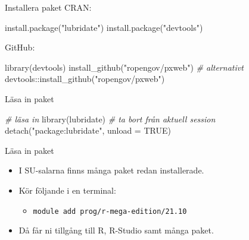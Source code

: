 \documentclass[
  11pt,
  ignorenonframetext,
]{beamer}
\newenvironment{Shaded}{\begin{snugshade}}{\end{snugshade}}
\newcommand{\AttributeTok}[1]{\textcolor[rgb]{0.77,0.63,0.00}{#1}}
\newcommand{\CommentTok}[1]{\textcolor[rgb]{0.56,0.35,0.01}{\textit{#1}}}
\newcommand{\ConstantTok}[1]{\textcolor[rgb]{0.00,0.00,0.00}{#1}}
\newcommand{\FunctionTok}[1]{\textcolor[rgb]{0.00,0.00,0.00}{#1}}
\newcommand{\NormalTok}[1]{#1}
\newcommand{\SpecialCharTok}[1]{\textcolor[rgb]{0.00,0.00,0.00}{#1}}
\newcommand{\StringTok}[1]{\textcolor[rgb]{0.31,0.60,0.02}{#1}}
\providecommand{\tightlist}{%
  \setlength{\itemsep}{0pt}\setlength{\parskip}{0pt}}
\begin{document}
\begin{frame}[fragile]{Installera paket}
\protect\hypertarget{installera-paket}{}
CRAN:

\begin{Shaded}
\begin{Highlighting}[]
\FunctionTok{install.package}\NormalTok{(}\StringTok{"lubridate"}\NormalTok{)}
\FunctionTok{install.package}\NormalTok{(}\StringTok{"devtools"}\NormalTok{)}
\end{Highlighting}
\end{Shaded}

GitHub:

\begin{Shaded}
\begin{Highlighting}[]
\FunctionTok{library}\NormalTok{(devtools)}
\FunctionTok{install\_github}\NormalTok{(}\StringTok{"ropengov/pxweb"}\NormalTok{)}
\CommentTok{\# alternativt}
\NormalTok{devtools}\SpecialCharTok{::}\FunctionTok{install\_github}\NormalTok{(}\StringTok{"ropengov/pxweb"}\NormalTok{)}
\end{Highlighting}
\end{Shaded}
\end{frame}

\begin{frame}[fragile]{Läsa in paket}
\protect\hypertarget{luxe4sa-in-paket}{}
\begin{Shaded}
\begin{Highlighting}[]
\CommentTok{\# läsa in}
\FunctionTok{library}\NormalTok{(lubridate)}
\CommentTok{\# ta bort från aktuell session}
\FunctionTok{detach}\NormalTok{(}\StringTok{"package:lubridate"}\NormalTok{, }\AttributeTok{unload =} \ConstantTok{TRUE}\NormalTok{)}
\end{Highlighting}
\end{Shaded}
\end{frame}

\begin{frame}{Läsa in paket}
\protect\hypertarget{luxe4sa-in-paket-1}{}
\begin{itemize}
\tightlist
\item
  I SU-salarna finns många paket redan installerade.
\item
  Kör följande i en terminal:

  \begin{itemize}
  \tightlist
  \item
    \texttt{module add prog/r-mega-edition/21.10}
  \end{itemize}
\item
  Då får ni tillgång till R, R-Studio samt många paket.
\end{itemize}
\end{frame}
\end{document}

